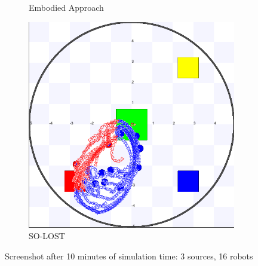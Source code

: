 \documentclass[letterpaper, 10 pt, conference]{ieeeconf}  %
\begin{document}
\begin{figure}[H]
\begin{subfigure}{.25\textwidth}
          \centering
          \caption{Embodied Approach}
     \end{subfigure}
    \centering
     \begin{subfigure}{.25\textwidth}
       \includegraphics[width=0.9\linewidth]{images/so-lost/3/raw/16.png}
          \centering
          \caption{SO-LOST}
     \end{subfigure}
   
   \centering
   \caption{Screenshot after 10 minutes of simulation time: 3 sources, 16 robots}
   \label{fig:screenshot_3_source}
\end{figure}
\end{document}
